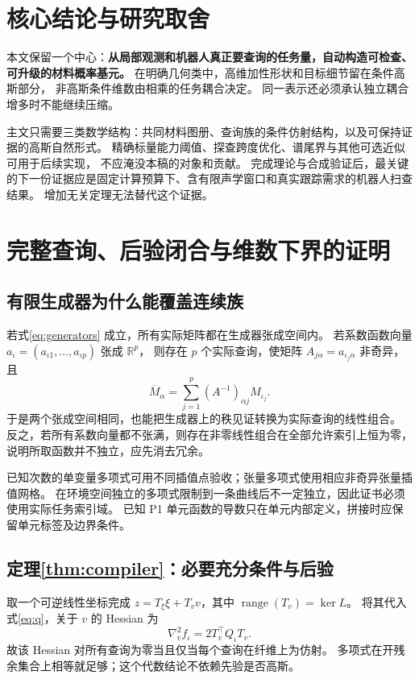 \documentclass[11pt,a4paper]{article}
\numberwithin{equation}{section}
\theoremstyle{definition}
\newcommand{\R}{\mathbb R}
\DeclareMathOperator{\range}{range}
\begin{document}
\section{核心结论与研究取舍}
本文保留一个中心：\textbf{从局部观测和机器人真正要查询的任务量，自动构造可检查、可升级的材料概率基元。}
在明确几何类中，高维加性形状和目标细节留在条件高斯部分，
非高斯条件维数由相乘的任务耦合决定。
同一表示还必须承认独立耦合增多时不能继续压缩。

主文只需要三类数学结构：共同材料图册、查询族的条件仿射结构，以及可保持证据的高斯自然形式。
精确标量能力阈值、探查跨度优化、谱尾界与其他可选近似可用于后续实现，
不应淹没本稿的对象和贡献。
完成理论与合成验证后，最关键的下一份证据应是固定计算预算下、含有限声学窗口和真实跟踪需求的机器人扫查结果。
增加无关定理无法替代这个证据。

\appendix
\section{完整查询、后验闭合与维数下界的证明}
\label{app:compiler}

\subsection{有限生成器为什么能覆盖连续族}
若式\eqref{eq:generators} 成立，所有实际矩阵都在生成器张成空间内。
若系数函数向量 \(a_\iota=(a_{\iota1},\ldots,a_{\iota p})\) 张成 \(\R^p\)，
则存在 \(p\) 个实际查询，使矩阵 \(A_{j\alpha}=a_{\iota_j\alpha}\) 非奇异，且
\[
 \overline M_\alpha=\sum_{j=1}^{p}(A^{-1})_{\alpha j}M_{\iota_j}.
\]
于是两个张成空间相同，也能把生成器上的秩见证转换为实际查询的线性组合。
反之，若所有系数向量都不张满，则存在非零线性组合在全部允许索引上恒为零，
说明所取函数并不独立，应先消去冗余。

已知次数的单变量多项式可用不同插值点验收；张量多项式使用相应非奇异张量插值网格。
在环境空间独立的多项式限制到一条曲线后不一定独立，因此证书必须使用实际任务索引域。
已知 P1 单元函数的导数只在单元内部定义，拼接时应保留单元标签及边界条件。

\subsection{定理\ref{thm:compiler}：必要充分条件与后验}
取一个可逆线性坐标完成 \(z=T_\xi\xi+T_vv\)，其中 \(\range(T_v)=\ker L\)。
将其代入式\eqref{eq:q}，关于 \(v\) 的 Hessian 为
\[
 \nabla_v^2 f_\iota=2T_v^\top Q_\iota T_v.
\]
故该 Hessian 对所有查询为零当且仅当每个查询在纤维上为仿射。
多项式在开残余集合上相等就足够；这个代数结论不依赖先验是否高斯。
\end{document}
